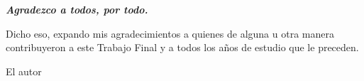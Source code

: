 %
      
{
    \itshape
    \small
    \textbf{Agradezco a todos, por todo.}
    
    Dicho eso, expando mis agradecimientos a quienes de alguna u otra manera contribuyeron a este Trabajo Final y a todos los años de estudio que le preceden.
    \vspace{1cm}
    \begin{flushright}
        El autor
    \end{flushright}
}


